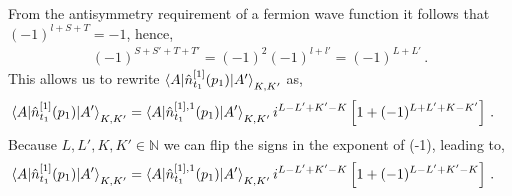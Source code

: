 \documentclass[10pt]{article}
\begin{document}
From the antisymmetry requirement of a fermion wave function it follows that $(-1)^{l+S+T}=-1$, hence,
\begin{align}
	(-1)^{S+S'+T+T'} = (-1)^{2}(-1)^{l+l'} = (-1)^{L+L'} \, .
	\label{eq:antisymm_phase_id}
\end{align}
This allows us to rewrite $\braket{ A | \hat{n}_{t_1}^{[1]}(p_1) | A'}_{K,K'}$ as,
\begin{align*}
	\braket{ A | \hat{n}_{t_1}^{[1]}(p_1) | A'}_{K,K'} &= \braket{ A | \hat{n}_{t_1}^{[1],1}(p_1) | A'}_{K,K'} i^{L-L' + K'-K} \left[ 1 + (-1)^{L+L'+K-K'} \right] \, .
\end{align*}
Because $L,L',K,K' \in \mathbb{N}$ we can flip the signs in the exponent of (-1), leading to,
\begin{align*}
	\braket{ A | \hat{n}_{t_1}^{[1]}(p_1) | A'}_{K,K'} &= \braket{ A | \hat{n}_{t_1}^{[1],1}(p_1) | A'}_{K,K'} i^{L-L' + K'-K} \left[ 1 + (-1)^{L-L'+K'-K} \right] \, .
\end{align*}
\end{document}

